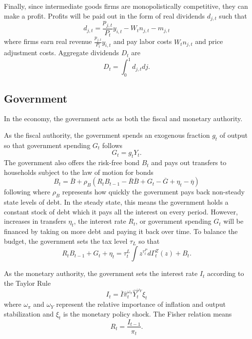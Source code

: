 Finally, since intermediate goods firms are monopolistically competitive, they can make a profit. Profits will be paid out in the form of real dividends $d_{j, t}$ such that
\begin{equation*}
    d_{j, t} = \frac{p_{j, t}}{P_t} y_{i, t} - W_t n_{j, t} - m_{j, t}
\end{equation*}
where firms earn real revenue $\frac{p_{j, t}}{P_t} y_{i, t}$ and pay labor costs $W_t n_{j, t}$ and price adjustment costs. Aggregate dividends $D_t$ are
\begin{equation*}
    D_t = \int_0^1 d_{j, t} dj.
\end{equation*}


\subsection{Government}

In the economy, the government acts as both the fiscal and monetary authority.

As the fiscal authority, the government spends an exogenous fraction $g_t$ of output so that government spending $G_t$ follows
\begin{equation*}
    G_t = g_t Y_t.
\end{equation*}
The government also offers the risk-free bond $B_t$ and pays out transfers to households subject to the law of motion for bonds
\begin{equation*}
    B_t = \overline{B} + \rho_B \left(R_t B_{t-1} - \overline{R} \overline{B} + G_t - \overline{G} + \eta_t - \overline{\eta}\right)
\end{equation*}
following \textcite{auclert2024intertemporal} where $\rho_B$ represents how quickly the government pays back non-steady state levels of debt. In the steady state, this means the government holds a constant stock of debt which it pays all the interest on every period. However, increases in transfers $\eta_t$, the interest rate $R_t$, or government spending $G_t$ will be financed by taking on more debt and paying it back over time. To balance the budget, the government sets the tax level $\tau_L$ so that
\begin{equation*}
    R_t B_{t - 1} + G_t + \eta_t = \tau_t^L \int z^{\tau_t^P} d \Gamma_t^Z (z) + B_t.
\end{equation*}

As the monetary authority, the government sets the interest rate $I_t$ according to the Taylor Rule
\begin{equation*}
    I_t = \overline{I} \hat{\pi}_t^{\omega_\pi} \hat{Y}_t^{\omega_Y} \xi_t
\end{equation*}
where $\omega_\pi$ and $\omega_Y$ represent the relative importance of inflation and output stabilization and $\xi_t$ is the monetary policy shock. The Fisher relation means
\begin{equation*}
    R_t = \frac{I_{t - 1}}{\pi_t}.
\end{equation*}


